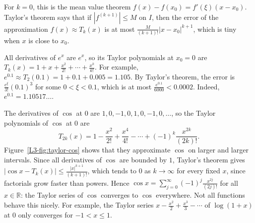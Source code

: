 For $k = 0$, this is the mean value theorem $f(x) - f(x_0) = f'(\xi)(x - x_0)$. Taylor's theorem says that if $|f^{(k+1)}| \leq M$ on $I$, then the error of the approximation $f(x) \approx T_k(x)$ is at most $\frac{M}{(k+1)!}|x - x_0|^{k+1}$, which is tiny when $x$ is close to $x_0$.

\begin{example}\label{L3-ex:taylor-exp}
    All derivatives of $e^x$ are $e^x$, so its Taylor polynomials at $x_0 = 0$ are $T_k(x) = 1 + x + \frac{x^2}{2!} + \cdots + \frac{x^k}{k!}$. For example, $e^{0.1} \approx T_2(0.1) = 1 + 0.1 + 0.005 = 1.105$. By Taylor's theorem, the error is $\frac{e^\xi}{3!} (0.1)^3$ for some $0 < \xi < 0.1$, which is at most $\frac{e^{0.1}}{6000} < 0.0002$. Indeed, $e^{0.1} = 1.10517\ldots$.
\end{example}

\begin{example}\label{L3-ex:taylor-cos}
    The derivatives of $\cos$ at $0$ are $1, 0, -1, 0, 1, 0, -1, 0, \ldots$, so the Taylor polynomials of $\cos$ at $0$ are
    \[T_{2k}(x) = 1 - \frac{x^2}{2!} + \frac{x^4}{4!} - \cdots + (-1)^k \frac{x^{2k}}{(2k)!}.\]
    Figure~\ref{L3-fig:taylor-cos} shows that they approximate $\cos$ on larger and larger intervals. Since all derivatives of $\cos$ are bounded by $1$, Taylor's theorem gives $|\cos x - T_k(x)| \leq \frac{|x|^{k+1}}{(k+1)!}$, which tends to $0$ as $k \to \infty$ for every fixed $x$, since factorials grow faster than powers. Hence $\cos x = \sum_{j=0}^\infty (-1)^j \frac{x^{2j}}{(2j)!}$ for all $x \in \mathbb{R}$: the Taylor series of $\cos$ converges to $\cos$ everywhere. Not all functions behave this nicely. For example, the Taylor series $x - \frac{x^2}{2} + \frac{x^3}{3} - \cdots$ of $\log(1 + x)$ at $0$ only converges for $-1 < x \leq 1$.
\end{example}

